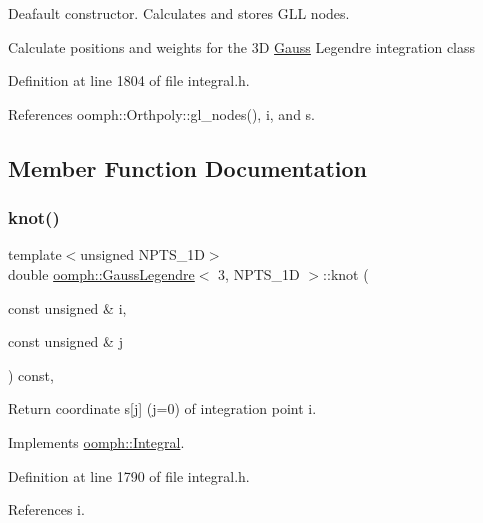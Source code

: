 Deafault constructor. Calculates and stores G\+LL nodes. 

Calculate positions and weights for the 3D \hyperlink{classoomph_1_1Gauss}{Gauss} Legendre integration class 

Definition at line 1804 of file integral.\+h.



References oomph\+::\+Orthpoly\+::gl\+\_\+nodes(), i, and s.



\subsection{Member Function Documentation}
\mbox{\label{classoomph_1_1GaussLegendre_3_013_00_01NPTS__1D_01_4_afd48661debb3035ed10b6656a8a9bcf5}} 
\subsubsection{\texorpdfstring{knot()}{knot()}}
{\footnotesize\ttfamily template$<$unsigned N\+P\+T\+S\+\_\+1D$>$ \\
double \hyperlink{classoomph_1_1GaussLegendre}{oomph\+::\+Gauss\+Legendre}$<$ 3, N\+P\+T\+S\+\_\+1D $>$\+::knot (\begin{DoxyParamCaption}\item[{const unsigned \&}]{i,  }\item[{const unsigned \&}]{j }\end{DoxyParamCaption}) const\hspace{0.3cm}{\ttfamily [inline]}, {\ttfamily [virtual]}}



Return coordinate s\mbox{[}j\mbox{]} (j=0) of integration point i. 



Implements \hyperlink{classoomph_1_1Integral_a1a2122f99a87c18649bafdd9ed739758}{oomph\+::\+Integral}.



Definition at line 1790 of file integral.\+h.



References i.

